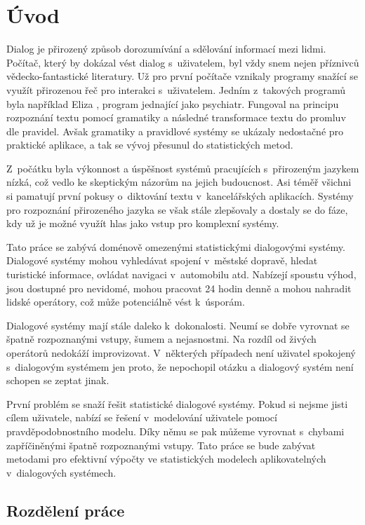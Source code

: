 \chapter*{Úvod}

Dialog je přirozený způsob dorozumívání a sdělování informací mezi lidmi.
Počítač, který by dokázal vést dialog s~uživatelem, byl vždy snem nejen příznivců vědecko-fantastické literatury.
Už pro první počítače vznikaly programy snažící se využít přirozenou řeč pro interakci s~uživatelem.
Jedním z~takových programů byla například Eliza \cite{weizenbaum1966eliza}, program jednající jako psychiatr.
Fungoval na principu rozpoznání textu pomocí gramatiky a následné transformace textu do promluv dle pravidel.
Avšak gramatiky a pravidlové systémy se ukázaly nedostačné pro praktické aplikace, a tak se vývoj přesunul do statistických metod.

Z~počátku byla výkonnost a úspěšnost systémů pracujících s~přirozeným jazykem nízká, což vedlo ke skeptickým názorům na jejich budoucnost.
Asi téměř všichni si pamatují první pokusy o~diktování textu v~kancelářských aplikacích.
Systémy pro rozpoznání přirozeného jazyka se však stále zlepšovaly a dostaly se do fáze, kdy už je možné využít hlas jako vstup pro komplexní systémy.

Tato práce se zabývá doménově omezenými statistickými dialogovými systémy.
Dialogové systémy mohou vyhledávat spojení v~městské dopravě, hledat turistické informace, ovládat navigaci v~automobilu atd.
Nabízejí spoustu výhod, jsou dostupné pro nevidomé, mohou pracovat 24 hodin denně a mohou nahradit lidské operátory, což může potenciálně vést k~úsporám.

Dialogové systémy mají stále daleko k~dokonalosti.
Neumí se dobře vyrovnat se špatně rozpoznanými vstupy, šumem a nejasnostmi.
Na rozdíl od živých operátorů nedokáží improvizovat.
V~některých případech není uživatel spokojený s~dialogovým systémem jen proto, že nepochopil otázku a dialogový systém není schopen se zeptat jinak.

První problém se snaží řešit statistické dialogové systémy.
Pokud si nejsme jisti cílem uživatele, nabízí se řešení v~modelování uživatele pomocí pravděpodobnostního modelu.
Díky němu se pak můžeme vyrovnat s~chybami zapříčiněnými špatně rozpoznanými vstupy.
Tato práce se bude zabývat metodami pro efektivní výpočty ve statistických modelech aplikovatelných v~dialogových systémech.

\section*{Rozdělení práce}

